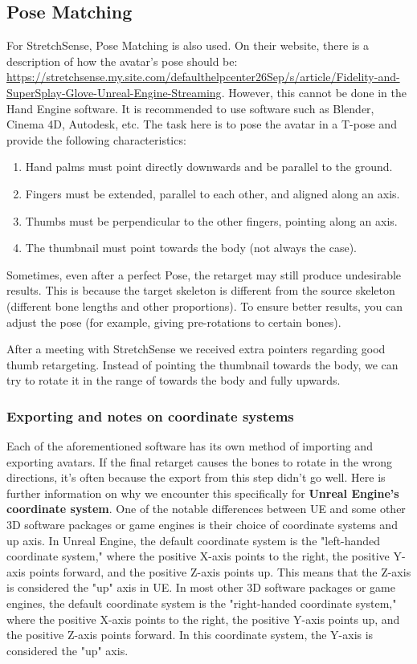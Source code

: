 \documentclass{uva-inf-article}
\begin{document}
\subsection{Pose Matching}
For StretchSense, Pose Matching is also used. On their website, there is a description of how the avatar's pose should be: \url{https://stretchsense.my.site.com/defaulthelpcenter26Sep/s/article/Fidelity-and-SuperSplay-Glove-Unreal-Engine-Streaming}. However, this cannot be done in the Hand Engine software. It is recommended to use software such as Blender, Cinema 4D, Autodesk, etc. The task here is to pose the avatar in a T-pose and provide the following characteristics:
\begin{enumerate}
    \item Hand palms must point directly downwards and be parallel to the ground.
    \item Fingers must be extended, parallel to each other, and aligned along an axis.
    \item Thumbs must be perpendicular to the other fingers, pointing along an axis.
    \item The thumbnail must point towards the body (not always the case).
\end{enumerate}

Sometimes, even after a perfect Pose, the retarget may still produce undesirable results. This is because the target skeleton is different from the source skeleton (different bone lengths and other proportions). To ensure better results, you can adjust the pose (for example, giving pre-rotations to certain bones).

After a meeting with StretchSense we received extra pointers regarding good thumb retargeting. Instead of pointing the thumbnail towards the body, we can try to rotate it in the range of towards the body and fully upwards.


\subsubsection{Exporting and notes on coordinate systems}
Each of the aforementioned software has its own method of importing and exporting avatars. If the final retarget causes the bones to rotate in the wrong directions, it's often because the export from this step didn't go well. Here is further information on why we encounter this specifically for  \textbf{Unreal Engine's coordinate system}.
One of the notable differences between UE and some other 3D software packages or game engines is their choice of coordinate systems and up axis.
In Unreal Engine, the default coordinate system is the "left-handed coordinate system," where the positive X-axis points to the right, the positive Y-axis points forward, and the positive Z-axis points up. This means that the Z-axis is considered the "up" axis in UE.
In most other 3D software packages or game engines, the default coordinate system is the "right-handed coordinate system," where the positive X-axis points to the right, the positive Y-axis points up, and the positive Z-axis points forward. In this coordinate system, the Y-axis is considered the "up" axis.
\end{document}
